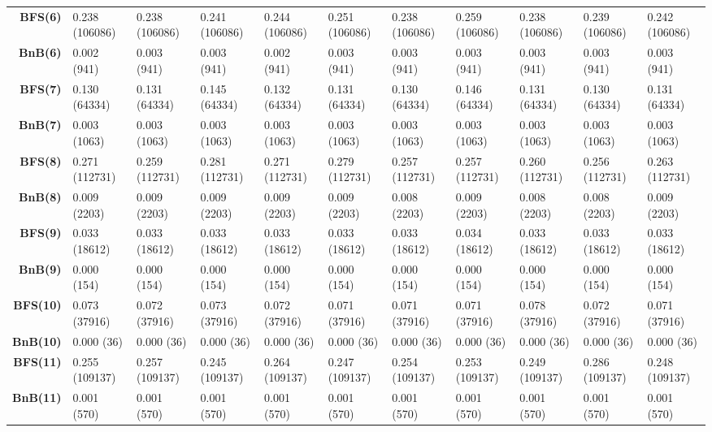 \begin{table}[ht]
\begin{adjustbox}{width=1.5\textwidth,center}
\begin{tabular}{r|llllllllll}
\textbf{BFS(6)} & 0.238 (106086) & 0.238 (106086) & 0.241 (106086) & 0.244 (106086) & 0.251 (106086) & 0.238 (106086) & 0.259 (106086) & 0.238 (106086) & 0.239 (106086) & 0.242 (106086) \\
\textbf{BnB(6)} & 0.002 (941) & 0.003 (941) & 0.003 (941) & 0.002 (941) & 0.003 (941) & 0.003 (941) & 0.003 (941) & 0.003 (941) & 0.003 (941) & 0.003 (941) \\ \hline

\textbf{BFS(7)} & 0.130 (64334) & 0.131 (64334) & 0.145 (64334) & 0.132 (64334) & 0.131 (64334) & 0.130 (64334) & 0.146 (64334) & 0.131 (64334) & 0.130 (64334) & 0.131 (64334) \\
\textbf{BnB(7)} & 0.003 (1063) & 0.003 (1063) & 0.003 (1063) & 0.003 (1063) & 0.003 (1063) & 0.003 (1063) & 0.003 (1063) & 0.003 (1063) & 0.003 (1063) & 0.003 (1063) \\ \hline

\textbf{BFS(8)} & 0.271 (112731) & 0.259 (112731) & 0.281 (112731) & 0.271 (112731) & 0.279 (112731) & 0.257 (112731) & 0.257 (112731) & 0.260 (112731) & 0.256 (112731) & 0.263 (112731) \\
\textbf{BnB(8)} & 0.009 (2203) & 0.009 (2203) & 0.009 (2203) & 0.009 (2203) & 0.009 (2203) & 0.008 (2203) & 0.009 (2203) & 0.008 (2203) & 0.008 (2203) & 0.009 (2203) \\ \hline

\textbf{BFS(9)} & 0.033 (18612) & 0.033 (18612) & 0.033 (18612) & 0.033 (18612) & 0.033 (18612) & 0.033 (18612) & 0.034 (18612) & 0.033 (18612) & 0.033 (18612) & 0.033 (18612) \\
\textbf{BnB(9)} & 0.000 (154) & 0.000 (154) & 0.000 (154) & 0.000 (154) & 0.000 (154) & 0.000 (154) & 0.000 (154) & 0.000 (154) & 0.000 (154) & 0.000 (154) \\ \hline

\textbf{BFS(10)} & 0.073 (37916) & 0.072 (37916) & 0.073 (37916) & 0.072 (37916) & 0.071 (37916) & 0.071 (37916) & 0.071 (37916) & 0.078 (37916) & 0.072 (37916) & 0.071 (37916) \\
\textbf{BnB(10)} & 0.000 (36) & 0.000 (36) & 0.000 (36) & 0.000 (36) & 0.000 (36) & 0.000 (36) & 0.000 (36) & 0.000 (36) & 0.000 (36) & 0.000 (36) \\ \hline

\textbf{BFS(11)} & 0.255 (109137) & 0.257 (109137) & 0.245 (109137) & 0.264 (109137) & 0.247 (109137) & 0.254 (109137) & 0.253 (109137) & 0.249 (109137) & 0.286 (109137) & 0.248 (109137) \\
\textbf{BnB(11)} & 0.001 (570) & 0.001 (570) & 0.001 (570) & 0.001 (570) & 0.001 (570) & 0.001 (570) & 0.001 (570) & 0.001 (570) & 0.001 (570) & 0.001 (570) \\ \hline


\end{tabular}
\end{adjustbox}
\end{table}
